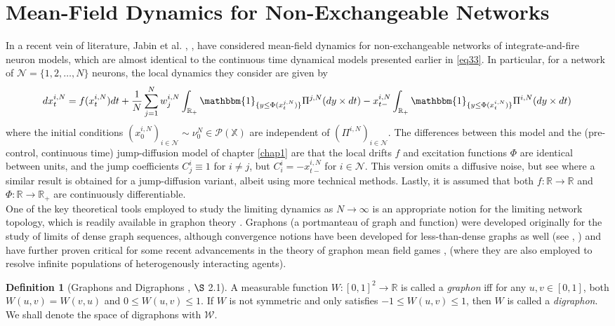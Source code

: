 \documentclass[12pt, oneside]{report}
\newcommand{\mbb}[1]{\mathbb{#1}}
\newcommand{\1}[1]{\mathbbm{1}_{\{#1\}}}
\newcommand{\mc}[1]{\mathcal{#1}}
\theoremstyle{definition}
\newtheorem{definition}[theorem]{Definition}
\begin{document}
\section{Mean-Field Dynamics for Non-Exchangeable Networks}\label{sec2}
In a recent vein of literature, Jabin et al. \cite{Jabin_Poyato_Soler_2021},
\cite{Jabin_Zhou_2023}, have considered mean-field dynamics for non-exchangeable
networks of integrate-and-fire neuron models, which are almost identical to the
continuous time dynamical models presented earlier in \ref{eq33}. In particular,
for a network of $\mc{N}=\{1,2,\dots,N\}$ neurons, the local dynamics they
consider are given by
\begin{align}
    dx^{i,N}_t=f(x^{i,N}_t)dt+\frac{1}{N}\sum_{j=1}^N w^{i,N}_{j}\int_{\mbb{R}_+}\1{y\leq \Phi(x^{j,N}_t)}\Pi^{j,N}(dy\times dt)-x^{i,N}_{t-}\int_{\mbb{R}_+}\1{y\leq \Phi(x^{i,N}_t)}\Pi^{i,N}(dy\times dt)\label{eq67}
\end{align}
where the initial conditions
$(x^{i,N}_0)_{i\in\mc{N}}\sim\nu_0^N\in\mc{P}(\mbb{X})$ are independent of
$(\Pi^{i,N})_{i\in\mc{N}}$. The differences between this model and the
(pre-control, continuous time) jump-diffusion model of chapter \ref{chap1} are
that the local drifts $f$ and excitation functions $\Phi$ are identical between
units, and the jump coefficients $C^i_j\equiv 1$ for $i\neq j$, but
$C^i_i=-x^{i,N}_{t-}$ for $i\in\mc{N}$. This version omits a diffusive noise,
but see \cite{Jabin_Zhou_2023} where a similar result is obtained for a
jump-diffusion variant, albeit using more technical methods. Lastly, it is
assumed that both $f:\mbb{R}\rightarrow\mbb{R}$ and
$\Phi:\mbb{R}\rightarrow\mbb{R}_+$ are continuously differentiable.\\[5pt]
\indent One of the key theoretical tools employed to study the limiting dynamics
as $N\rightarrow\infty$ is an appropriate notion for the limiting network
topology, which is readily available in graphon theory \cite{Lovasz_2012}.
Graphons (a portmanteau of graph and function) were developed originally for the
study of limits of dense graph sequences, although convergence notions have been
developed for less-than-dense graphs as well (see \cite{Jabin_Zhou_2023},
\cite{Borgs_Chayes_Cohn_Zhao_2018}) and have further proven critical for some
recent advancements in the theory of graphon mean field games
\cite{Caines_Huang_2019}, \cite{Fabian_Cui_Koeppl_2023} (where they are also
employed to resolve infinite populations of heterogenously interacting agents).
\begin{definition}[Graphons and Digraphons \cite{Jabin_Poyato_Soler_2021}, $\S$ 2.1]
    A measurable function $W:[0,1]^2\rightarrow\mbb{R}$ is called a
    \textit{graphon} iff for any $u,v\in[0,1]$, both $W(u,v)=W(v,u)$ and $0\leq
    W(u,v)\leq 1$. If $W$ is not symmetric and only satisfies $-1\leq W(u,v)\leq
    1$, then $W$ is called a \textit{digraphon}. We shall denote the space of
    digraphons with $\mc{W}$.
\end{definition}
\end{document}
